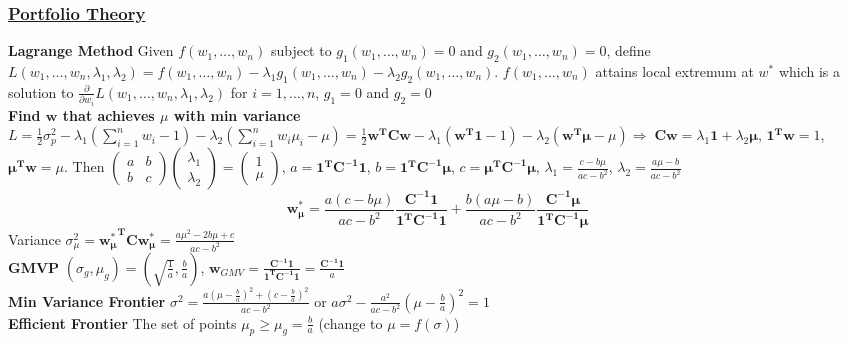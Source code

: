 \documentclass{article}
\begin{document}
{\begin{multicols*}{3}
\subsubsection*{\underline{Portfolio Theory}}
\textbf{Lagrange Method} Given $f(w_1,\dots,w_n)$ subject to $g_1(w_1,\dots,w_n)=0$ and $g_2(w_1,\dots,w_n)=0$, define $L(w_1,\dots,w_n,\lambda_1,\lambda_2)=f(w_1,\dots,w_n)-\lambda_1g_1(w_1,\dots,w_n)-\lambda_2g_2(w_1,\dots,w_n)$. $f(w_1,\dots,w_n)$ attains local extremum at $w^*$ which is a solution to $\frac{\partial}{\partial w_i}L(w_1,\dots,w_n,\lambda_1,\lambda_2)$ for $i=1,\dots,n$, $g_1=0$ and $g_2=0$ \\
\textbf{Find $\mathbf{w}$ that achieves $\mu$ with min variance} $L=\frac{1}{2}\sigma_p^2-\lambda_1\left(\sum_{i=1}^n w_i - 1\right)-\lambda_2\left(\sum_{i=1}^nw_i \mu_i-\mu\right)=\frac{1}{2}\boldsymbol{w^T Cw}-\lambda_1(\boldsymbol{w^T1}-1)-\lambda_2(\boldsymbol{w^T\mu} -\mu)\Longrightarrow \;\boldsymbol{Cw=}\lambda_1\mathbf{1}+\lambda_2\boldsymbol{\mu}$, $\mathbf{1\boldsymbol{^T}w}=1$, $\boldsymbol{\mu^Tw}=\mu$. Then $\begin{pmatrix}a & b\\ b & c\end{pmatrix}\begin{pmatrix}\lambda_1 \\ \lambda_2\end{pmatrix}=\begin{pmatrix}1 \\ \mu \end{pmatrix} $, $a=\boldsymbol{1^TC^{-1}1}$, $b=\boldsymbol{1^TC^{-1}\mu}$, $c=\boldsymbol{\mu^TC^{-1}\mu}$, $\lambda_1=\frac{c-b\mu}{ac-b^2}$, $\lambda_2=\frac{a\mu-b}{ac-b^2}$ $$\boldsymbol{w_\mu^*}=\frac{a(c-b\mu)}{ac-b^2}\frac{\boldsymbol{C^{-1}1}}{\boldsymbol{1^TC^{-1}1}}+\frac{b(a\mu-b)}{ac-b^2}\frac{\boldsymbol{C^{-1}\mu}}{\boldsymbol{1^TC^{-1}\mu}}$$ 
Variance $\sigma_\mu^2=\boldsymbol{{w_\mu^{*}}^T Cw_\mu^*}=\frac{a\mu^2-2b\mu+c}{ac-b^2}$ \\
\textbf{GMVP} $(\sigma_{g},\mu_{g})= (\sqrt{\frac{1}{a}}, \frac{b}{a})$, $\boldsymbol{w}_{GMV}=\frac{\boldsymbol{C^{-1}1}}{\boldsymbol{1^TC^{-1}1}}=\frac{\boldsymbol{C^{-1}1}}{a}$  \\
\textbf{Min Variance Frontier} $\sigma^2=\frac{a(\mu-\frac{b}{a})^2+(c-\frac{b}{a})^2}{ac-b^2}$ or $a\sigma^2-\frac{a^2}{ac-b^2}(\mu-\frac{b}{a})^2=1$ \\
\textbf{Efficient Frontier} The set of points $\mu_p\geq \mu_g=\frac{b}{a}$ (change to $\mu=f(\sigma)$) \\

\end{multicols*}}
\end{document}
